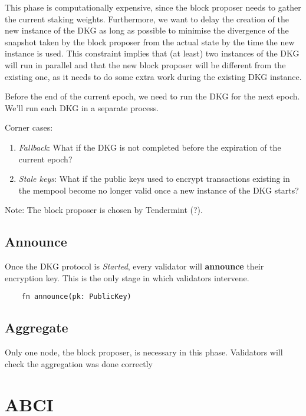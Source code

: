 \documentclass[acmsmall]{acmart}
\numberwithin{figure}{subsection}
\begin{document}
This phase is computationally expensive, since the block proposer needs to gather the current staking weights. Furthermore, we want to delay the creation of the new instance of the DKG as long as possible to minimise the divergence of the snapshot taken by the block proposer from the actual state by the time the new instance is used. This constraint implies that (at least) two instances of the DKG will run in parallel and that the new block proposer will be different from the existing one, as it needs to do some extra work during the existing DKG instance.

Before the end of the current epoch, we need to run the DKG for the next epoch. We'll run each DKG in a separate process.

Corner cases:
\begin{enumerate}
    \item \textit{Fallback}: What if the DKG is not completed before the expiration of the current epoch?
    \item \textit{Stale keys}: What if the public keys used to encrypt transactions existing in the mempool become no longer valid once a new instance of the DKG starts?
\end{enumerate}

Note: The block proposer is chosen by Tendermint (?).

\subsection{Announce}

Once the DKG protocol is \textit{Started}, every validator will \textbf{announce} their encryption key. This is the only stage in which validators intervene.

\begin{lstlisting}
    fn announce(pk: PublicKey)
\end{lstlisting}

\subsection{Aggregate}

Only one node, the block proposer, is necessary in this phase. Validators will check the aggregation was done correctly

\section{ABCI}
\end{document}
